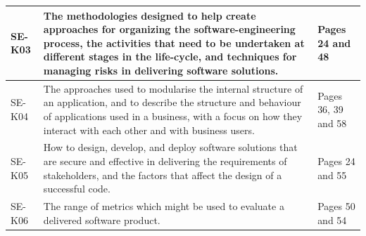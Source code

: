 \begin{longtable}{|p{2cm}|p{8cm}|p{4cm}|}
      SE-K03              & The methodologies designed to help create approaches for organizing
                            the software-engineering process, the activities that need to be
                            undertaken at different stages in the life-cycle, and techniques for
                            managing risks in delivering software solutions. & Pages 24 and 48 \\ \hline

      SE-K04              & The approaches used to modularise the internal structure of an
                            application, and to describe the structure and behaviour of applications
                            used in a business, with a focus on how they interact with each other
                            and with business users. & Pages 36, 39 and 58 \\ \hline

      SE-K05              & How to design, develop, and deploy software solutions that are secure
                            and effective in delivering the requirements of stakeholders, and
                            the factors that affect the design of a successful code. & Pages 24 and 55 \\ \hline

      SE-K06              & The range of metrics which might be used to evaluate a delivered
                            software product. & Pages 50 and 54 \\ \hline

      
    \end{longtable}
